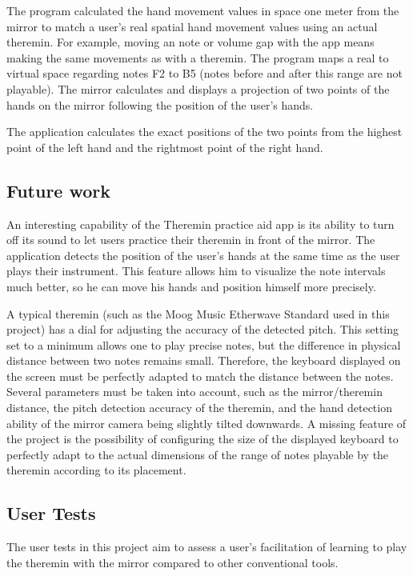 The program calculated the hand movement values in space one meter from the mirror to match a user's real spatial hand movement values using an actual theremin. For example, moving an note or volume gap with the app means making the same movements as with a theremin. The program maps a real to virtual space regarding notes F2 to B5 (notes before and after this range are not playable). The mirror calculates and displays a projection of two points of the hands on the mirror following the position of the user's hands.

The application calculates the exact positions of the two points from the highest point of the left hand and the rightmost point of the right hand.

\subsection{Future work}

An interesting capability of the Theremin practice aid app is its ability to turn off its sound to let users practice their theremin in front of the mirror. The application detects the position of the user's hands at the same time as the user plays their instrument. This feature allows him to visualize the note intervals much better, so he can move his hands and position himself more precisely. 

A typical theremin (such as the Moog Music Etherwave Standard used in this project) has a dial for adjusting the accuracy of the detected pitch. This setting set to a minimum allows one to play precise notes, but the difference in physical distance between two notes remains small. Therefore, the keyboard displayed on the screen must be perfectly adapted to match the distance between the notes. Several parameters must be taken into account, such as the mirror/theremin distance, the pitch detection accuracy of the theremin, and the hand detection ability of the mirror camera being slightly tilted downwards. 
A missing feature of the project is the possibility of configuring the size of the displayed keyboard to perfectly adapt to the actual dimensions of the range of notes playable by the theremin according to its placement.

\subsection*{User Tests}

The user tests in this project aim to assess a user’s facilitation of learning to play the theremin with the mirror compared to other conventional tools.


